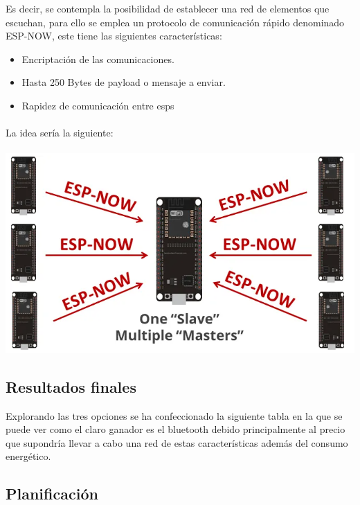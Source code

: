 \documentclass[a4paper ,12pt, onecolumn]{article}
\begin{document}
\begin{enumerate}
                Es decir, se contempla la posibilidad de establecer una red de elementos que escuchan, para ello se emplea 
                un protocolo de comunicación rápido denominado ESP-NOW, este tiene las siguientes características:
                \begin{itemize}
                    \item Encriptación de las comunicaciones.
                    \item Hasta 250 Bytes de payload o mensaje a enviar.
                    \item Rapidez de comunicación entre esps
                \end{itemize}
                \paragraph{}
                La idea sería la siguiente:
                \paragraph{}
                \includegraphics[scale=0.5]{espnow.png}
            \end{enumerate}
    \subsection{Resultados finales}
        Explorando las tres opciones se ha confeccionado la siguiente tabla en la que se puede ver como el claro ganador es el  bluetooth debido 
        principalmente al precio que supondría llevar a cabo una red de estas características además del consumo energético.
            
    \subsection{Planificación}
\end{document}
